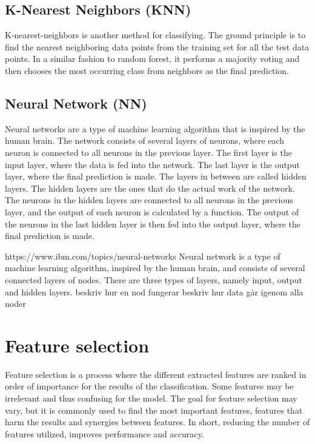 \documentclass{kththesis}
\begin{document}

\subsection{K-Nearest Neighbors (KNN)}

K-nearest-neighbors is another method for classifying. The ground principle is to find the nearest neighboring data points from the training set for all the test data points. In a similar fashion to random forest, it performs a majority voting and then chooses the most occurring class from neighbors as the final prediction.


\subsection{Neural Network (NN)}

Neural networks are a type of machine learning algorithm that is inspired by the human brain. The network consists of several layers of neurons, where each neuron is connected to all neurons in the previous layer. The first layer is the input layer, where the data is fed into the network. The last layer is the output layer, where the final prediction is made. The layers in between are called hidden layers. The hidden layers are the ones that do the actual work of the network. The neurons in the hidden layers are connected to all neurons in the previous layer, and the output of each neuron is calculated by a function. The output of the neurons in the last hidden layer is then fed into the output layer, where the final prediction is made.


https://www.ibm.com/topics/neural-networks
Neural network is a type of machine learning algorithm, inspired by the human brain, and consists of several connected layers of nodes. There are three types of layers, namely input, output and hidden layers. 
beskriv hur en nod fungerar
beskriv hur data går igenom alla noder

\section{Feature selection}


Feature selection is a process where the different extracted features are ranked in order of importance for the results of the classification. Some features may be irrelevant and thus confusing for the model. The goal for feature selection may vary, but it is commonly used to find the most important features, features that harm the results and synergies between features. In short, reducing the number of features utilized, improves performance and accuracy. %
\end{document}
